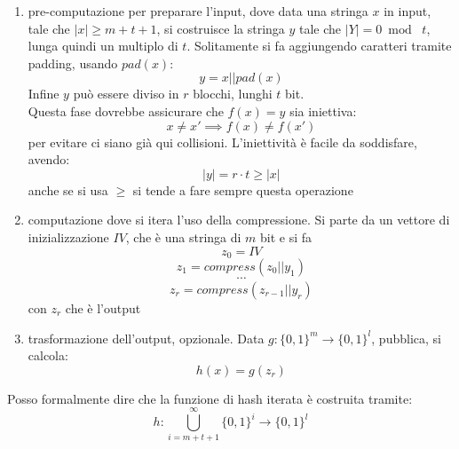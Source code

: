 \documentclass[a4paper,12pt, oneside]{book}
\begin{document}
\begin{enumerate}
  \item pre-computazione per preparare l'input, dove data una stringa $x$ in
  input, tale che $|x|\geq m+t+1$, si costruisce la stringa $y$ tale che
  $|Y|=0\bmod \,\,t$, lunga quindi un multiplo di $t$. Solitamente si fa
  aggiungendo caratteri tramite padding, usando $pad(x)$:
  \[y=x||pad(x)\]
  Infine $y$ può essere diviso in $r$ blocchi, lunghi $t$ bit.\\
  Questa fase dovrebbe assicurare che $f(x)=y$ sia iniettiva:
  \[x\neq x'\implies f(x)\neq f(x')\]
  per evitare ci siano già qui collisioni. L'iniettività è facile da soddisfare,
  avendo:
  \[|y|=r\cdot t\geq |x|\]
  anche se si usa $\geq$ si tende a fare sempre questa operazione
  \item computazione dove si itera l'uso della compressione. Si parte da un
  vettore di inizializzazione $IV$, che è una stringa di $m$ bit e si fa
  \[z_0=IV\]
  \[z_1=compress(z_0||y_1)\]
  \[\cdots\]
  \[z_r=compress(z_{r-1}||y_r) \]
  con $z_r$ che è l'output
  \item trasformazione dell'output, opzionale. Data $g:\{0,1\}^m\to\{0,1\}^l$,
  pubblica, si calcola:
  \[h(x)=g(z_r)\]
\end{enumerate}
Posso formalmente dire che la funzione di hash iterata è costruita tramite:
\[h:\bigcup_{i=m+t+1}^\infty\{0,1\}^i\to\{0,1\}^l\]
\end{document}
